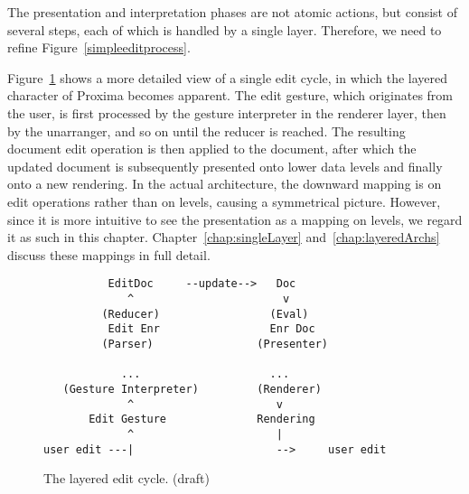 The presentation and interpretation phases are not atomic actions, but consist of several steps, each of which is handled by a single layer. Therefore, we need to refine Figure~\ref{simpleeditprocess}. 

Figure~\ref{simplelayers} shows a more detailed view of a single edit cycle, in which the layered character of Proxima becomes apparent. The edit gesture, which originates from the user, is first processed by the gesture interpreter in the renderer layer, then by the unarranger, and so on until the reducer is reached. The resulting document edit operation is then applied to the document, after which the updated document is subsequently presented onto lower data levels and finally onto a new rendering. In the actual architecture, the downward mapping is on edit operations rather than on levels, causing a symmetrical picture. However, since it is more intuitive to see the presentation as a mapping on levels, we regard it as such in this chapter. Chapter~\ref{chap:singleLayer} and~\ref{chap:layeredArchs} discuss these mappings in full detail.

\begin{figure}
\begin{small}
\begin{center}
\begin{center}
\begin{scriptsize}
\begin{verbatim}
          EditDoc     --update-->   Doc       																																	  
             ^                       v
         (Reducer)                 (Eval)     																																	  
          Edit Enr                 Enr Doc    																																	  
         (Parser)                (Presenter)  																																	  
                                           																																	  
            ...                    ...       																																	  
   (Gesture Interpreter)         (Renderer)   																																	  
             ^                      v
       Edit Gesture              Rendering    																																	  
             ^                      |         																																	  
user edit ---|                      -->     user edit
\end{verbatim}
\end{scriptsize}
\end{center}\caption{The layered edit cycle. (draft)} \label{simplelayers} 
\end{center}
\end{small}
\end{figure}


